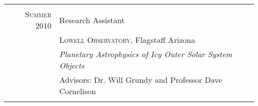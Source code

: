 \documentclass[letterpaper,10pt]{article} %
\begin{document}
\begin{tabular}{r|p{11cm}}
\multicolumn{2}{c}{} \\


\textsc{Summer 2010} & Research Assistant \\
& \textsc{Lowell Observatory}, Flagstaff Arizona \\
&\emph{Planetary Astrophysics of Icy Outer Solar System Objects}\\ 
& Advisors: Dr. Will Grundy and Professor Dave Cornelison \\

\multicolumn{2}{c}{} \\


\end{tabular}
\end{document}

